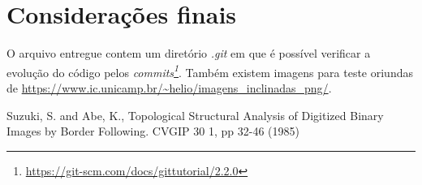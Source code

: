 \documentclass[10pt,twocolumn,letterpaper]{article}
\begin{document}
\section{Considerações finais}
O arquivo entregue contem um diretório \emph{.git} em que é possível verificar a evolução do código pelos \emph{commits\footnote{\url{https://git-scm.com/docs/gittutorial/2.2.0}}}.
Também existem imagens para teste oriundas de \url{https://www.ic.unicamp.br/~helio/imagens_inclinadas_png/}.


\begin{thebibliography}{1}

Suzuki, S. and Abe, K.,
\newblock Topological Structural Analysis of Digitized Binary Images by Border Following.
\newblock CVGIP 30 1,
\newblock pp 32-46 (1985)

\end{thebibliography}
\end{document}
